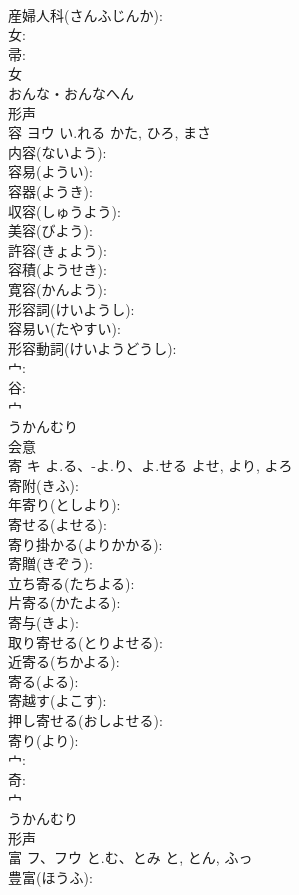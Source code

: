\documentclass[8pt]{extreport}
\begin{document}
\begin{CJK}{UTF8}{min}
\\	産婦人科(さんふじんか): 
\\	女: 
\\	帚: 
\\	女	
\\	おんな・おんなへん	
\\	形声 
\\	容	ヨウ	い.れる	かた, ひろ, まさ	
\\	内容(ないよう): 
\\	容易(ようい): 
\\	容器(ようき): 
\\	収容(しゅうよう): 
\\	美容(びよう): 
\\	許容(きょよう): 
\\	容積(ようせき): 
\\	寛容(かんよう): 
\\	形容詞(けいようし): 
\\	容易い(たやすい): 
\\	形容動詞(けいようどうし): 
\\	宀: 
\\	谷: 
\\	宀	
\\	うかんむり	
\\	会意 
\\	寄	キ	よ.る、-よ.り、よ.せる	よせ, より, よろ	
\\	寄附(きふ): 
\\	年寄り(としより): 
\\	寄せる(よせる): 
\\	寄り掛かる(よりかかる): 
\\	寄贈(きぞう): 
\\	立ち寄る(たちよる): 
\\	片寄る(かたよる): 
\\	寄与(きよ): 
\\	取り寄せる(とりよせる): 
\\	近寄る(ちかよる): 
\\	寄る(よる): 
\\	寄越す(よこす): 
\\	押し寄せる(おしよせる): 
\\	寄り(より): 
\\	宀: 
\\	奇: 
\\	宀	
\\	うかんむり	
\\	形声 
\\	富	フ、フウ	と.む、とみ	と, とん, ふっ	
\\	豊富(ほうふ): 

\end{CJK}
\end{document}

